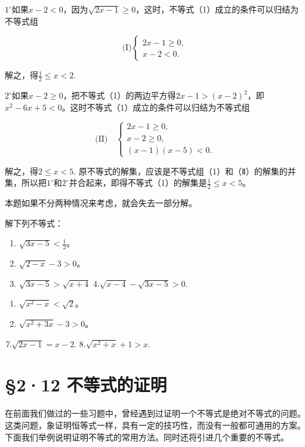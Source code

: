 \(1^{\circ}\)如果\(x - 2 < 0\)，因为\(\sqrt{2x - 1} \geqslant 0\)，这时，不等式（1）成立的条件可以归结为不等式组

\[
\text{(I)} \left\{ \begin{array}{l} 2 x - 1 \geqslant 0, \\ x - 2 < 0. \end{array} \right.
\]

解之，得\(\frac{1}{2} \leqslant x < 2.\)

\(2^{\circ}\)如果\(x - 2 \geqslant 0\)，把不等式（1）的两边平方得\(2x - 1 > (x - 2)^{2}\)，即\(x^{2} - 6x + 5 < 0\)。这时不等式（1）成立的条件可以归结为不等式组

\[
\text{(II)} \quad \left\{ \begin{array}{l} 2 x - 1 \geqslant 0, \\ x - 2 \geqslant 0, \\ (x - 1) (x - 5) < 0. \end{array} \right.
\]

解之，得\(2 \leqslant x < 5.\)
原不等式的解集，应该是不等式组（1）和（Ⅱ）的解集的并集，所以把\(1^{\circ}\)和\(2^{\circ}\)并合起来，即得不等式（1）的解集是\(\frac{1}{2} \leqslant x < 5\)。

 本题如果不分两种情况来考虑，就会失去一部分解。

解下列不等式：

\begin{enumerate}[start=1]
\item
  \(\sqrt{3x - 5} < \frac{1}{2}\)。
\item
  \(\sqrt{2 - x} - 3 > 0\)。
\item
  \(\sqrt{3x - 5} >\sqrt{x + 4}\) 4.\(\sqrt{x - 4} -\sqrt{3x - 5} >0.\)
\end{enumerate}
\begin{enumerate}[start=5]
\item
  \(\sqrt{x^2 - x} < \sqrt{2}\)。
\item
  \(\sqrt{x^2 + 3x} - 3 > 0\)。
\end{enumerate}

\emph{7.\(\sqrt{2x - 1} = x - 2.\) }8.\(\sqrt{x^2 + x} + 1 > x.\)

\section{§2·12 不等式的证明}

在前面我们做过的一些习题中，曾经遇到过证明一个不等式是绝对不等式的问题。这类问题，象证明恒等式一样，具有一定的技巧性，而没有一般都可通用的方案。下面我们举例说明证明不等式的常用方法。同时还将引进几个重要的不等式。

